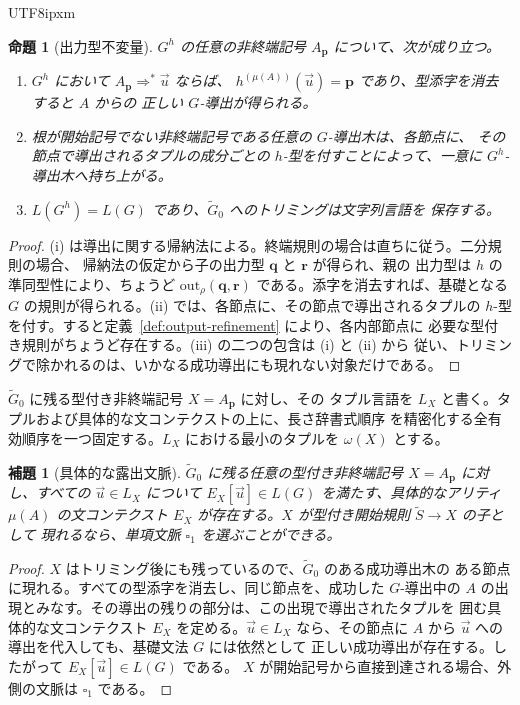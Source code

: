 \documentclass[10pt,a4paper]{article}
\newtheorem{lemma}[theorem]{補題}
\newtheorem{proposition}[theorem]{命題}
\theoremstyle{remark}
\newcommand{\out}{\mathrm{out}}
\newcommand{\tuple}[1]{\vec{#1}}
\newcommand{\blank}{\square}
\begin{document}
\begin{CJK}{UTF8}{ipxm}
\begin{proposition}[出力型不変量]
\label{prop:output-invariants}
\(G^h\) の任意の非終端記号 \(A_{\mathbf p}\) について、次が成り立つ。
\begin{enumerate}[label=(\roman*),leftmargin=*]
\item \(G^h\) において \(A_{\mathbf p}\Rightarrow^*\tuple u\) ならば、
\(h^{(\mu(A))}(\tuple u)=\mathbf p\) であり、型添字を消去すると \(A\) からの
正しい \(G\)-導出が得られる。
\item 根が開始記号でない非終端記号である任意の \(G\)-導出木は、各節点に、
その節点で導出されるタプルの成分ごとの \(h\)-型を付すことによって、一意に
\(G^h\)-導出木へ持ち上がる。
\item \(L(G^h)=L(G)\) であり、\(\widetilde G_0\) へのトリミングは文字列言語を
保存する。
\end{enumerate}
\end{proposition}

\begin{proof}
(i) は導出に関する帰納法による。終端規則の場合は直ちに従う。二分規則の場合、
帰納法の仮定から子の出力型 \(\mathbf q\) と \(\mathbf r\) が得られ、親の
出力型は \(h\) の準同型性により、ちょうど
\(\out_\rho(\mathbf q,\mathbf r)\) である。添字を消去すれば、基礎となる
\(G\) の規則が得られる。(ii) では、各節点に、その節点で導出されるタプルの
\(h\)-型を付す。すると定義~\ref{def:output-refinement} により、各内部節点に
必要な型付き規則がちょうど存在する。(iii) の二つの包含は (i) と (ii) から
従い、トリミングで除かれるのは、いかなる成功導出にも現れない対象だけである。
\end{proof}

\(\widetilde G_0\) に残る型付き非終端記号 \(X=A_{\mathbf p}\) に対し、その
タプル言語を \(L_X\) と書く。タプルおよび具体的な文コンテクストの上に、長さ辞書式順序
を精密化する全有効順序を一つ固定する。\(L_X\) における最小のタプルを
\(\omega(X)\) とする。

\begin{lemma}[具体的な露出文脈]
\label{lem:exposing-contexts}
\(\widetilde G_0\) に残る任意の型付き非終端記号
\(X=A_{\mathbf p}\) に対し、すべての \(\tuple u\in L_X\) について
\(E_X[\tuple u]\in L(G)\) を満たす、具体的なアリティ \(\mu(A)\) の文コンテクスト
\(E_X\) が存在する。\(X\) が型付き開始規則 \(\widetilde S\to X\) の子として
現れるなら、単項文脈 \(\blank_1\) を選ぶことができる。
\end{lemma}

\begin{proof}
\(X\) はトリミング後にも残っているので、\(\widetilde G_0\) のある成功導出木の
ある節点に現れる。すべての型添字を消去し、同じ節点を、成功した \(G\)-導出中の
\(A\) の出現とみなす。その導出の残りの部分は、この出現で導出されたタプルを
囲む具体的な文コンテクスト \(E_X\) を定める。\(\tuple u\in L_X\) なら、その節点に
\(A\) から \(\tuple u\) への導出を代入しても、基礎文法 \(G\) には依然として
正しい成功導出が存在する。したがって \(E_X[\tuple u]\in L(G)\) である。
\(X\) が開始記号から直接到達される場合、外側の文脈は \(\blank_1\) である。
\end{proof}


\end{CJK}
\end{document}
